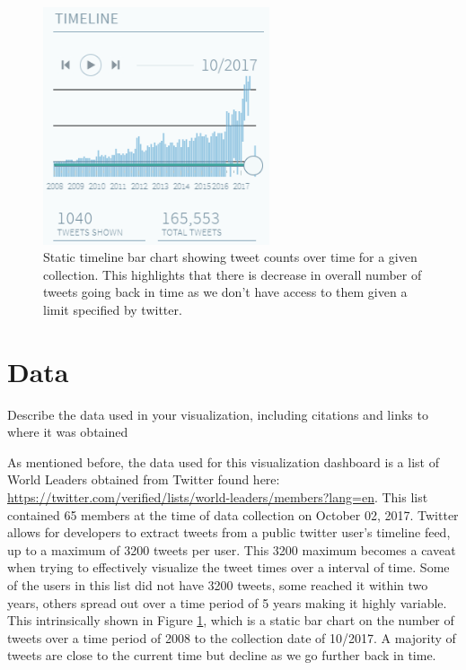 \documentclass[journal]{vgtc}                %
\begin{document}
\begin{figure}[tb]
 \centering %
 \includegraphics[height=7cm,width=\columnwidth, keepaspectratio]{imgs/timeline.png}
 \caption{Static timeline bar chart showing tweet counts over time for a given collection. This highlights that there is decrease in overall number of tweets going back in time as we don't have access to them given a limit specified by twitter.}
 \label{fig:statbar}
\end{figure}

\section {Data} \label{data-ref}
Describe the data used in your visualization, including citations and links to where it was obtained

As mentioned before, the data used for this visualization dashboard is a list of World Leaders obtained from Twitter \cite{twit-worldlist} found here: \url{https://twitter.com/verified/lists/world-leaders/members?lang=en}.
This list contained 65 members at the time of data collection on October 02, 2017.
Twitter allows for developers to extract tweets from a public twitter user's timeline feed, up to a maximum of 3200 tweets per user.
This 3200 maximum becomes a caveat when trying to effectively visualize the tweet times over a interval of time.
Some of the users in this list did not have 3200 tweets, some reached it within two years, others spread out over a time period of 5 years making it highly variable.
This intrinsically shown in Figure \ref{fig:statbar}, which is a static bar chart on the number of tweets over a time period of 2008 to the collection date of 10/2017. 
A majority of tweets are close to the current time but decline as we go further back in time.
\end{document}
